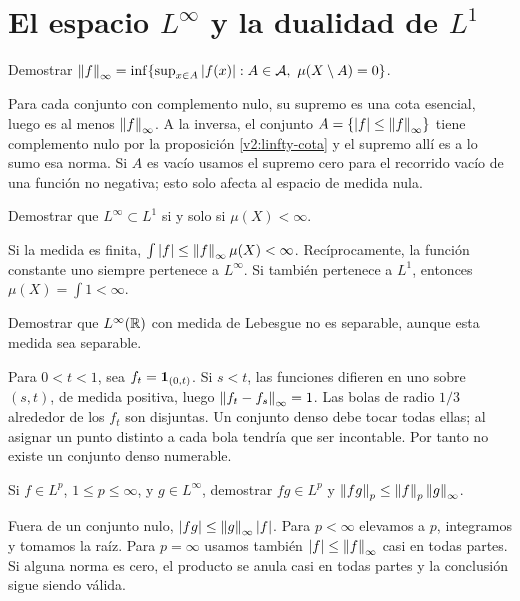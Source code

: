 \chapter{El espacio \texorpdfstring{$L^\infty$}{L infinito} y la dualidad de \texorpdfstring{$L^1$}{L1}}

\begin{ejercicio}\label{ej:v2-l22-1}
Demostrar $\left\lVert f\right\rVert_\infty=\inf\{\sup_{x\in A}|f(x)|:A\in\mathcal A,\ \mu(X\setminus A)=0\}$.
\end{ejercicio}
\begin{solucion}
Para cada conjunto con complemento nulo, su supremo es una cota esencial, luego es al menos $\left\lVert f\right\rVert_\infty$. A la inversa, el conjunto $A=\{|f|\le\left\lVert f\right\rVert_\infty\}$ tiene complemento nulo por la proposición \ref{v2:linfty-cota} y el supremo allí es a lo sumo esa norma. Si $A$ es vacío usamos el supremo cero para el recorrido vacío de una función no negativa; esto solo afecta al espacio de medida nula.
\end{solucion}

\begin{ejercicio}\label{ej:v2-l22-2}
Demostrar que $L^\infty\subset L^1$ si y solo si $\mu(X)<\infty$.
\end{ejercicio}
\begin{solucion}
Si la medida es finita, $\int|f|\le\left\lVert f\right\rVert_\infty\mu(X)<\infty$. Recíprocamente, la función constante uno siempre pertenece a $L^\infty$. Si también pertenece a $L^1$, entonces $\mu(X)=\int1<\infty$.
\end{solucion}

\begin{ejercicio}\label{ej:v2-l22-3}
Demostrar que $L^\infty(\mathbb R)$ con medida de Lebesgue no es separable, aunque esta medida sea separable.
\end{ejercicio}
\begin{solucion}
Para $0<t<1$, sea $f_t=\mathbf1_{(0,t)}$. Si $s<t$, las funciones difieren en uno sobre $(s,t)$, de medida positiva, luego $\left\lVert f_t-f_s\right\rVert_\infty=1$. Las bolas de radio $1/3$ alrededor de los $f_t$ son disjuntas. Un conjunto denso debe tocar todas ellas; al asignar un punto distinto a cada bola tendría que ser incontable. Por tanto no existe un conjunto denso numerable.
\end{solucion}

\begin{ejercicio}\label{ej:v2-l22-4}
Si $f\in L^p$, $1\le p\le\infty$, y $g\in L^\infty$, demostrar $fg\in L^p$ y $\left\lVert fg\right\rVert_p\le\left\lVert f\right\rVert_p\left\lVert g\right\rVert_\infty$.
\end{ejercicio}
\begin{solucion}
Fuera de un conjunto nulo, $|fg|\le\left\lVert g\right\rVert_\infty|f|$. Para $p<\infty$ elevamos a $p$, integramos y tomamos la raíz. Para $p=\infty$ usamos también $|f|\le\left\lVert f\right\rVert_\infty$ casi en todas partes. Si alguna norma es cero, el producto se anula casi en todas partes y la conclusión sigue siendo válida.
\end{solucion}

